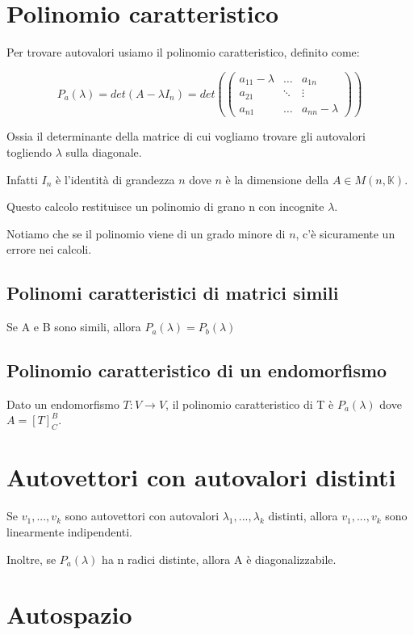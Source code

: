 \documentclass[a4paper, 10pt]{article}
\begin{document}
\section{Polinomio caratteristico}

Per trovare autovalori usiamo il polinomio caratteristico, definito come:

$$P_a(\lambda) = det(A-\lambda I_n)=det(\begin{pmatrix}
	a_{11} - \lambda & \dots & a_{1n} \\
	a_{21} & \ddots  & \vdots \\
	a_{n1} & \dots & a_{nn} - \lambda
\end{pmatrix})$$

Ossia il determinante della matrice di cui vogliamo trovare gli autovalori togliendo $\lambda$ sulla diagonale.

Infatti $I_n$ è l'identità di grandezza $n$ dove $n$ è la dimensione della $A \in M(n, \mathbb{K})$.

Questo calcolo restituisce un polinomio di grano n con incognite $\lambda$. 

Notiamo che se il polinomio viene di un grado minore di $n$, c'è sicuramente un errore nei calcoli.

\subsection{Polinomi caratteristici di matrici simili}

Se A e B sono simili, allora $P_a(\lambda) = P_b(\lambda)$

\subsection{Polinomio caratteristico di un endomorfismo}

Dato un endomorfismo $T:V \rightarrow V$, il polinomio caratteristico di T è $P_a(\lambda)$ dove $A=[T]^B_C$.

\section{Autovettori con autovalori distinti}

Se $v_1, ..., v_k$ sono autovettori con autovalori $\lambda_1, ..., \lambda_k$ distinti, allora $v_1, ..., v_k$ sono linearmente indipendenti.

Inoltre, se $P_a(\lambda)$ ha n radici distinte, allora A è diagonalizzabile.

\section{Autospazio}
\end{document}
